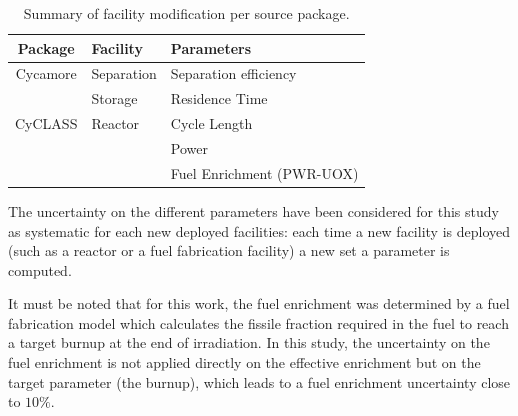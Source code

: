 \documentclass{anstrans}
\begin{document}
\begin{table}[htb]
\centering
  \caption{Summary of facility modification per source package.}
\begin{tabular}{cll}
\toprule

Package   & Facility   & Parameters                \\
\midrule
Cycamore & Separation & Separation efficiency     \\
         & Storage    & Residence Time            \\
\midrule
CyCLASS  & Reactor    & Cycle Length              \\
         &            & Power                     \\
         &            & Fuel Enrichment (PWR-UOX) \\

\bottomrule
\end{tabular}

  \label{tab:package_uncertainty}
\end{table}

The uncertainty on the different parameters have been considered for this study
as systematic for each new deployed facilities: each time a new facility is
deployed (such as a reactor or a fuel fabrication facility) a new set a
parameter is computed.

It must be noted that for this work, the fuel enrichment was determined by a
fuel fabrication model\cite{Leniau2015125} which
calculates the fissile fraction required in the fuel to reach a target
burnup at the end of irradiation.  In this study, the uncertainty on the fuel
enrichment is not applied directly on the effective enrichment but on the target
parameter (the burnup), which leads to a fuel enrichment uncertainty close to
$10\%$.
\end{document}
